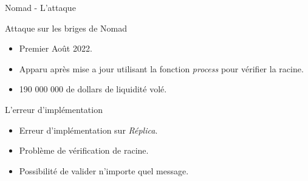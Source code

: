 
\begin{frame}{Nomad - L'attaque}
    \begin{block}{Attaque sur les briges de Nomad}
        \begin{itemize}
            \item Premier Août 2022.
            \item Apparu après mise a jour utilisant la fonction \textit{process} pour vérifier la racine.
            \item 190 000 000 de dollars de liquidité volé.
        \end{itemize}
    \end{block}
    \begin{block}{L'erreur d'implémentation}
        \begin{itemize}
            \item Erreur d'implémentation sur \textit{Réplica}.
            \item Problème de vérification de racine.
            \item Possibilité de valider n'importe quel message.
        \end{itemize}
    \end{block}
\end{frame}

